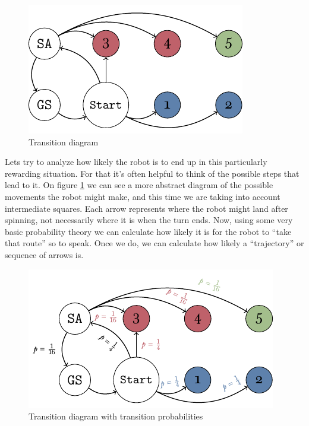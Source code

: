 \begin{figure}[h]
	\centering
	\includegraphics[width=\textwidth]{img/transicion.pdf}
	\caption{Transition diagram}
	\label{fig:miniopoly-transicion}
\end{figure}

Lets try to analyze how likely the robot is to end up in this 
particularly rewarding situation. For that it's often helpful to 
think of the possible steps that lead to it. On figure 
\ref{fig:miniopoly-transicion} we can see a more abstract 
diagram of the possible movements the robot might make, and this 
time we are taking into account intermediate squares. Each arrow 
represents where the robot might land after spinning, not 
necessarily where it is when the turn ends. Now, using some very 
basic probability theory we can calculate how likely it is for 
the robot to ``take that route'' so to speak. Once we do, we can 
calculate how likely a ``trajectory'' or sequence of arrows is.

\begin{figure}[h]
	\centering
	\includegraphics[width=\textwidth]{img/transicion-markov.pdf}
	\caption{Transition diagram with transition probabilities}
	\label{fig:miniopoly-transicion-markov}
\end{figure}

